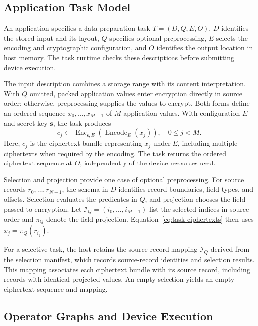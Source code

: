 \documentclass[sigconf,anonymous,balance=false]{acmart}
\newcommand{\bodypar}{\par\vskip 0pt plus 6pt\relax}
\begin{document}
\subsection{Application Task Model}
\label{subsec:application-task}

An application specifies a data-preparation task $T=(D,Q,E,O)$. $D$ identifies the stored input and its layout, $Q$ specifies optional preprocessing, $E$ selects the encoding and cryptographic configuration, and $O$ identifies the output location in host memory. The task runtime checks these descriptions before submitting device execution.
\bodypar

The input description combines a storage range with its content interpretation. With $Q$ omitted, packed application values enter encryption directly in source order; otherwise, preprocessing supplies the values to encrypt. Both forms define an ordered sequence $x_0,\ldots,x_{M-1}$ of $M$ application values. With configuration $E$ and secret key $\mathbf{s}$, the task produces
\begin{equation}
  c_j \leftarrow \operatorname{Enc}_{\mathbf{s},E}\!\left(
    \operatorname{Encode}_{E}\!\left(x_j\right)
  \right),\quad 0\leq j<M.
  \label{eq:task-ciphertexts}
\end{equation}
Here, $c_j$ is the ciphertext bundle representing $x_j$ under $E$, including multiple ciphertexts when required by the encoding. The task returns the ordered ciphertext sequence at $O$, independently of the device resources used.
\bodypar

Selection and projection provide one case of optional preprocessing. For source records $r_0,\ldots,r_{N-1}$, the schema in $D$ identifies record boundaries, field types, and offsets. Selection evaluates the predicates in $Q$, and projection chooses the field passed to encryption. Let $\mathcal{I}_Q=(i_0,\ldots,i_{M-1})$ list the selected indices in source order and $\pi_Q$ denote the field projection. Equation~\eqref{eq:task-ciphertexts} then uses $x_j=\pi_Q(r_{i_j})$.

For a selective task, the host retains the source-record mapping $\mathcal{I}_Q$ derived from the selection manifest, which records source-record identities and selection results. This mapping associates each ciphertext bundle with its source record, including records with identical projected values. An empty selection yields an empty ciphertext sequence and mapping.

\subsection{Operator Graphs and Device Execution}
\label{subsec:operator-execution}
\end{document}
